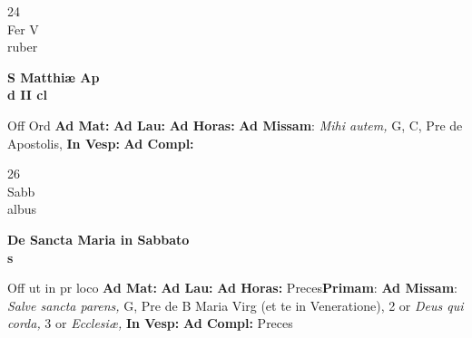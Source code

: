 \documentclass[10pt, openany]{book}
\begin{document}
        \begin{center}
            \begin{minipage}{3.5in}
                \vspace{2em}
                \begin{minipage}{0.5in}
                    {\Huge 24} \\
                    {\normalsize Fer V} \\
                    {\normalsize ruber}
                \end{minipage}
                \begin{minipage}{3.0in}
                    \textbf{ \large S Matthiæ Ap \\
                    \textnormal{\normalsize d II cl}} \\ 
                \end{minipage}
                \begin{justify}Off Ord
                    \textbf{Ad Mat: }
                    \textbf{Ad Lau: }
                    \textbf{Ad Horas: }\textbf{Ad Missam}: \textit{Mihi autem,} G, C, Pre de Apostolis,  
                    \textbf{In Vesp: }
                    \textbf{Ad Compl: }
                \end{justify}
            \end{minipage}
        \end{center}
    
        \begin{center}
            \begin{minipage}{3.5in}
                \vspace{2em}
                \begin{minipage}{0.5in}
                    {\Huge 26} \\
                    {\normalsize Sabb} \\
                    {\normalsize albus}
                \end{minipage}
                \begin{minipage}{3.0in}
                    \textbf{ \large De Sancta Maria in Sabbato \\
                    \textnormal{\normalsize s}} \\ 
                \end{minipage}
                \begin{justify}Off ut in pr loco
                    \textbf{Ad Mat: }
                    \textbf{Ad Lau: }
                    \textbf{Ad Horas: }Preces\textbf{Primam}: \textbf{Ad Missam}: \textit{Salve sancta parens,} G, Pre de B Maria Virg (et te in Veneratione), 2 or \textit{Deus qui corda,} 3 or \textit{Ecclesiæ,}  
                    \textbf{In Vesp: }
                    \textbf{Ad Compl: }Preces
                \end{justify}
            \end{minipage}
        \end{center}
    
\end{document}
